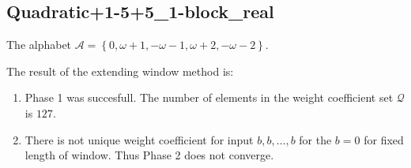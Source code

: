\subsection{ Quadratic+1-5+5\_1-block\_real }

\label{subsec:Quadratic+1-5+51-blockreal}

The alphabet $\mathcal{A} =\left\{0, \omega + 1, -\omega - 1, \omega + 2, -\omega - 2\right\}$.

\noindent The result of the extending window method is:
\begin{enumerate}
    \item Phase 1 was succesfull.
The number of elements in the weight coefficient set $\mathcal{Q}$ is $127$.

    \item There is not unique weight coefficient for input $b,b,\dots,b$ for the $b= 0 $ for fixed length of window. Thus Phase 2 does not converge.

\end{enumerate}
